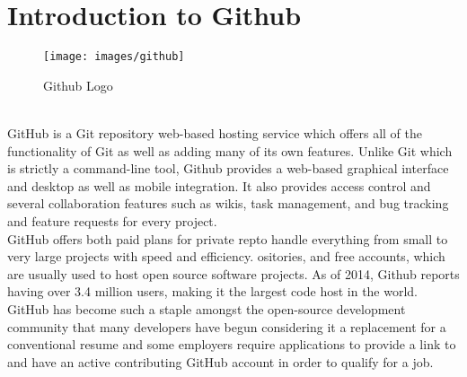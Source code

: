 \section{Introduction to Github}
\begin{figure}[!ht]
\centering
\texttt{[image: images/github]}                   
\caption{Github Logo}
\hspace{-1.5em}
\end{figure}
\leavevmode\\
GitHub is a Git repository web-based hosting service which offers all of the functionality of Git as well as adding many of its own features. Unlike Git which is strictly a command-line tool, Github provides a web-based graphical interface and desktop as well as mobile integration. It also provides access control and several collaboration features such as wikis, task management, and bug tracking and feature requests for every project.\\

GitHub offers both paid plans for private repto handle everything from small to very large projects with speed and efficiency. ositories, and free accounts, which are usually used to host open source software projects. As of 2014, Github reports having over 3.4 million users, making it the largest code host in the world.\\

GitHub has become such a staple amongst the open-source development community that many developers have begun considering it a replacement for a conventional resume and some employers require applications to provide a link to and have an active contributing GitHub account in order to qualify for a job.\\


